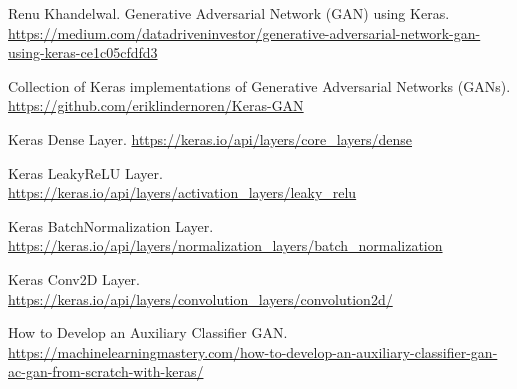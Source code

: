 \begin{thebibliography}{9}
 Renu Khandelwal. Generative Adversarial Network (GAN) using Keras.
\href{https://medium.com/datadriveninvestor/generative-adversarial-network-gan-using-keras-ce1c05cfdfd3}{https://medium.com/datadriveninvestor/generative-adversarial-network-gan-using-keras-ce1c05cfdfd3}

 Collection of Keras implementations of Generative Adversarial Networks (GANs).
\href{https://github.com/eriklindernoren/Keras-GAN}{https://github.com/eriklindernoren/Keras-GAN}

 Keras Dense Layer.
\href{https://keras.io/api/layers/core\_layers/dense}{https://keras.io/api/layers/core\_layers/dense}

 Keras LeakyReLU Layer.
\href{https://keras.io/api/layers/activation\_layers/leaky\_relu}{https://keras.io/api/layers/activation\_layers/leaky\_relu}

 Keras BatchNormalization Layer.
\href{https://keras.io/api/layers/normalization\_layers/batch\_normalization}{https://keras.io/api/layers/normalization\_layers/batch\_normalization}

 Keras Conv2D Layer.
\href{https://keras.io/api/layers/convolution\_layers/convolution2d/}{https://keras.io/api/layers/convolution\_layers/convolution2d/}

 How to Develop an Auxiliary Classifier GAN.
\href{https://machinelearningmastery.com/how-to-develop-an-auxiliary-classifier-gan-ac-gan-from-scratch-with-keras/}{https://machinelearningmastery.com/how-to-develop-an-auxiliary-classifier-gan-ac-gan-from-scratch-with-keras/}

\end{thebibliography}